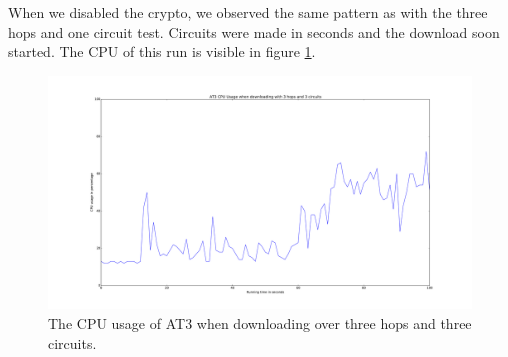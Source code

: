 		When we disabled the crypto, we observed the same pattern as with the three hops and one circuit test. Circuits were made in seconds and the download soon started. The CPU of this run is visible in figure \ref*{fig:cpu_3_hops_3_circuits}.
		
		\begin{figure}[!h]
			\centering
			\includegraphics[width=\textwidth]{graphics/cpu_usage_3_hops_3_circuits.pdf}
			\caption{The CPU usage of AT3 when downloading over three hops and three circuits.}
			\label{fig:cpu_3_hops_3_circuits}
		\end{figure}
		
\newpage